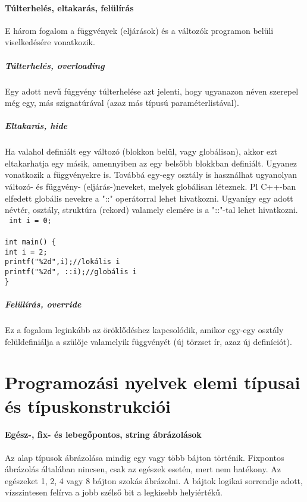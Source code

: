 \documentclass[fleqn,10pt,a4paper]{article}
\newcommand{\ut}[1]{\texttt{#1}}
\newcommand{\utt}[1]{\\\ut{#1}}
\theoremstyle{magyar}
\begin{document}
  \paragraph{Túlterhelés, eltakarás, felülírás}
  E három fogalom a függvények (eljárások) és a változók programon
  belüli viselkedésére vonatkozik.
  
  \subparagraph{Túlterhelés, overloading}
  Egy adott nevű függvény
  túlterhelése azt jelenti, hogy ugyanazon néven szerepel még egy, más
  szignatúrával (azaz más típusú paraméterlistával).
  
  \subparagraph{Eltakarás, hide}
  Ha valahol definiált egy változó (blokkon belül, vagy globálisan),
  akkor ezt eltakarhatja egy másik, amennyiben az egy belsőbb blokkban
  definiált. Ugyanez vonatkozik a függvényekre is. Továbbá egy-egy
  osztály is használhat ugyanolyan változó- és függvény-
  (eljárás-)neveket, melyek globálisan léteznek. Pl C++-ban elfedett
  globális nevekre a "::" operátorral lehet hivatkozni. Ugyanígy egy
  adott névtér, osztály, struktúra (rekord) valamely elemére is a
  "::"-tal lehet hivatkozni.
  \utt{
    int i = 0;\\\\
    int main() \{\\
    \hspace*{0.5em}int i = 2;\\
    \hspace*{0.5em}printf("\%2d",i);\quad//lokális i\\
    \hspace*{0.5em}printf("\%2d", ::i);\quad//globális i\\
    \}
  }
  \subparagraph{Felülírás, override}
  Ez a fogalom leginkább az öröklődéshez kapcsolódik, amikor egy-egy
  osztály felüldefiniálja a szülője valamelyik függvényét (új törzset
  ír, azaz új definíciót).
  
  \newpage
  \section{Programozási nyelvek elemi típusai és típuskonstrukciói}\label{sec:elemitip}
  \paragraph{Egész-, fix- és lebegőpontos, string ábrázolások}
  Az alap típusok ábrázolása mindig egy vagy több bájton
  történik. Fixpontos ábrázolás általában nincsen, csak az egészek
  esetén, mert nem hatékony. Az egészeket 1, 2, 4 vagy 8 bájton szokás
  ábrázolni. A bájtok logikai sorrendje adott, vízszintesen felírva a
  jobb  szélső bit a legkisebb helyiértékű.
  
\end{document}
